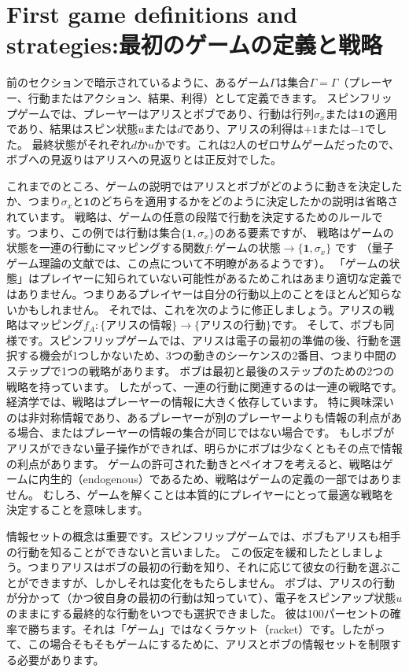 \section{First game definitions and strategies:最初のゲームの定義と戦略}

前のセクションで暗示されているように、あるゲーム$\Gamma$は集合$\Gamma=\Gamma$（プレーヤー、行動またはアクション、結果、利得）として定義できます。
スピンフリップゲームでは、プレーヤーはアリスとボブであり、行動は行列$\sigma_x$または$\mathbf{1}$の適用であり、結果はスピン状態$u$または$d$であり、アリスの利得は$+1$または$-1$でした。
最終状態がそれぞれ$d$か$u$かです。これは2人のゼロサムゲームだったので、ボブへの見返りはアリスへの見返りとは正反対でした。

これまでのところ、ゲームの説明ではアリスとボブがどのように動きを決定したか、つまり$\sigma_x$と$\mathbf{1}$のどちらを適用するかをどのように決定したかの説明は省略されています。
戦略は、ゲームの任意の段階で行動を決定するためのルールです。つまり、この例では行動は集合$\{ \mathbf{1}, \sigma_x \}$のある要素ですが、
戦略はゲームの状態を一連の行動にマッピングする関数$f: \text{ゲームの状態} \rightarrow \{ \mathbf{1}, \sigma_x \}$ です
（量子ゲーム理論の文献では、この点について不明瞭があるようです）。
「ゲームの状態」はプレイヤーに知られていない可能性があるためこれはあまり適切な定義ではありません。つまりあるプレイヤーは自分の行動以上のことをほとんど知らないかもしれません。
それでは、これを次のように修正しましょう。アリスの戦略はマッピング$f_A: \{\text{アリスの情報}\} \rightarrow \{\text{アリスの行動}\}$です。
そして、ボブも同様です。スピンフリップゲームでは、アリスは電子の最初の準備の後、行動を選択する機会が1つしかないため、3つの動きのシーケンスの2番目、つまり中間のステップで1つの戦略があります。
ボブは最初と最後のステップのための2つの戦略を持っています。
したがって、一連の行動に関連するのは一連の戦略です。経済学では、戦略はプレーヤーの情報に大きく依存しています。
特に興味深いのは非対称情報であり、あるプレーヤーが別のプレーヤーよりも情報の利点がある場合、またはプレーヤーの情報の集合が同じではない場合です。
もしボブがアリスができない量子操作ができれば、明らかにボブは少なくともその点で情報の利点があります。
ゲームの許可された動きとペイオフを考えると、戦略はゲームに内生的（endogenous）であるため、戦略はゲームの定義の一部ではありません。
むしろ、ゲームを解くことは本質的にプレイヤーにとって最適な戦略を決定することを意味します。

情報セットの概念は重要です。スピンフリップゲームでは、ボブもアリスも相手の行動を知ることができないと言いました。
この仮定を緩和したとしましょう。つまりアリスはボブの最初の行動を知り、それに応じて彼女の行動を選ぶことができますが、しかしそれは変化をもたらしません。
ボブは、アリスの行動が分かって（かつ彼自身の最初の行動は知っていて）、電子をスピンアップ状態$u$のままにする最終的な行動をいつでも選択できました。
彼は100パーセントの確率で勝ちます。それは「ゲーム」ではなくラケット（racket）です。したがって、この場合そもそもゲームにするために、アリスとボブの情報セットを制限する必要があります。

